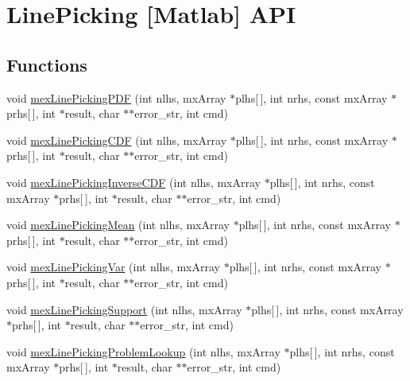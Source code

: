 \hypertarget{group__matlabapi}{\section{Line\-Picking \mbox{[}Matlab\mbox{]} A\-P\-I}
\label{group__matlabapi}
}
\subsection*{Functions}
\begin{DoxyCompactItemize}
\item 
void \hyperlink{group__matlabapi_ga415ab39c370dfeb66324d1a538a8bb7b}{mex\-Line\-Picking\-P\-D\-F} (int nlhs, mx\-Array $\ast$plhs\mbox{[}$\,$\mbox{]}, int nrhs, const mx\-Array $\ast$prhs\mbox{[}$\,$\mbox{]}, int $\ast$result, char $\ast$$\ast$error\-\_\-str, int cmd)
\item 
void \hyperlink{group__matlabapi_ga565be7534fefd6e5547869fdcb21b36f}{mex\-Line\-Picking\-C\-D\-F} (int nlhs, mx\-Array $\ast$plhs\mbox{[}$\,$\mbox{]}, int nrhs, const mx\-Array $\ast$prhs\mbox{[}$\,$\mbox{]}, int $\ast$result, char $\ast$$\ast$error\-\_\-str, int cmd)
\item 
void \hyperlink{group__matlabapi_ga7f5402e478356fda7514c795d131ecfc}{mex\-Line\-Picking\-Inverse\-C\-D\-F} (int nlhs, mx\-Array $\ast$plhs\mbox{[}$\,$\mbox{]}, int nrhs, const mx\-Array $\ast$prhs\mbox{[}$\,$\mbox{]}, int $\ast$result, char $\ast$$\ast$error\-\_\-str, int cmd)
\item 
void \hyperlink{group__matlabapi_ga6fe54a6aa7e3d2e51733dea1a443a1b2}{mex\-Line\-Picking\-Mean} (int nlhs, mx\-Array $\ast$plhs\mbox{[}$\,$\mbox{]}, int nrhs, const mx\-Array $\ast$prhs\mbox{[}$\,$\mbox{]}, int $\ast$result, char $\ast$$\ast$error\-\_\-str, int cmd)
\item 
void \hyperlink{group__matlabapi_gaceb40f4eec3174186785fca28818c09f}{mex\-Line\-Picking\-Var} (int nlhs, mx\-Array $\ast$plhs\mbox{[}$\,$\mbox{]}, int nrhs, const mx\-Array $\ast$prhs\mbox{[}$\,$\mbox{]}, int $\ast$result, char $\ast$$\ast$error\-\_\-str, int cmd)
\item 
void \hyperlink{group__matlabapi_gaa1d58f45751e79cccbc82eedccef460e}{mex\-Line\-Picking\-Support} (int nlhs, mx\-Array $\ast$plhs\mbox{[}$\,$\mbox{]}, int nrhs, const mx\-Array $\ast$prhs\mbox{[}$\,$\mbox{]}, int $\ast$result, char $\ast$$\ast$error\-\_\-str, int cmd)
\item 
void \hyperlink{group__matlabapi_ga8b9723f66253c299cb2bd065c48d1d11}{mex\-Line\-Picking\-Problem\-Lookup} (int nlhs, mx\-Array $\ast$plhs\mbox{[}$\,$\mbox{]}, int nrhs, const mx\-Array $\ast$prhs\mbox{[}$\,$\mbox{]}, int $\ast$result, char $\ast$$\ast$error\-\_\-str, int cmd)
$$
\end{DoxyCompactItemize}

